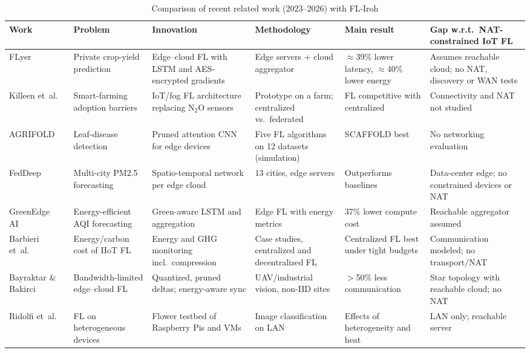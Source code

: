 \begin{table}[!t]
\centering
\caption{Comparison of recent related work (2023--2026) with FL-Iroh}
\label{tab:related}
\scriptsize
\renewcommand{\arraystretch}{1.15}
\setlength{\tabcolsep}{3pt}
\begin{tabular}{@{}p{1.75cm} p{2.6cm} p{3.0cm} p{2.9cm} p{2.6cm} p{3.6cm}@{}}
\toprule
\textbf{Work} & \textbf{Problem} & \textbf{Innovation} & \textbf{Methodology} & \textbf{Main result} & \textbf{Gap w.r.t.\ NAT-constrained IoT FL} \\
\midrule
FLyer~\cite{dey2025} & Private crop-yield prediction & Edge--cloud FL with LSTM and AES-encrypted gradients & Edge servers + cloud aggregator & $\approx$39\% lower latency, $\approx$40\% lower energy & Assumes reachable cloud; no NAT, discovery or WAN tests \\
Killeen et~al.~\cite{killeen2025} & Smart-farming adoption barriers & IoT/fog FL architecture replacing N$_2$O sensors & Prototype on a farm; centralized vs.\ federated & FL competitive with centralized & Connectivity and NAT not studied \\
AGRIFOLD~\cite{piccialli2025} & Leaf-disease detection & Pruned attention CNN for edge devices & Five FL algorithms on 12 datasets (simulation) & SCAFFOLD best & No networking evaluation \\
FedDeep~\cite{hu2024} & Multi-city PM2.5 forecasting & Spatio-temporal network per edge cloud & 13 cities, edge servers & Outperforms baselines & Data-center edge; no constrained devices or NAT \\
GreenEdge AI~\cite{dey2026} & Energy-efficient AQI forecasting & Green-aware LSTM and aggregation & Edge FL with energy metrics & 37\% lower compute cost & Reachable aggregator assumed \\
Barbieri et~al.~\cite{barbieri2025} & Energy/carbon cost of IIoT FL & Energy and GHG monitoring incl.\ compression & Case studies, centralized and decentralized FL & Centralized FL best under tight budgets & Communication modeled; no transport/NAT \\
Bayraktar \& Bakirci~\cite{bayraktar2026} & Bandwidth-limited edge--cloud FL & Quantized, pruned deltas; energy-aware sync & UAV/industrial vision, non-IID sites & $>$50\% less communication & Star topology with reachable cloud; no NAT \\
Ridolfi et~al.~\cite{ridolfi2023} & FL on heterogeneous devices & Flower testbed of Raspberry Pis and VMs & Image classification on LAN & Effects of heterogeneity and heat & LAN only; reachable server \\

\end{tabular}
\end{table}
